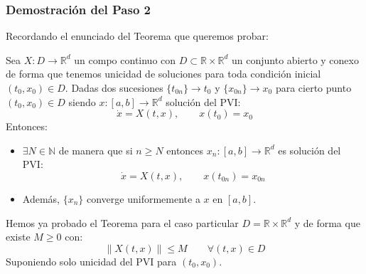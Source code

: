 \subsubsection{Demostración del Paso 2}
\noindent
Recordando el enunciado del Teorema que queremos probar:
\begin{teo} 
    Sea $X:D\to \mathbb{R}^d$ un compo continuo con $D\subset \mathbb{R}\times \mathbb{R}^d$ un conjunto abierto y conexo de forma que tenemos unicidad de soluciones para toda condición inicial $(t_0,x_0)\in D$. Dadas dos sucesiones $\{t_{0n}\}\to t_0$ y $\{x_{0n}\}\to x_0$ para cierto punto $(t_0,x_0)\in D$ siendo $x:[a,b]\to \mathbb{R}^d$ solución del PVI:
    \begin{equation*}
        \dot{x} = X(t,x), \qquad x(t_0) = x_0
    \end{equation*}
    Entonces:
    \begin{itemize}
        \item $\exists N\in \mathbb{N}$ de manera que si $n\geq N$ entonces $x_n:[a,b]\to \mathbb{R}^d$ es solución del PVI:
            \begin{equation*}
                \dot{x} = X(t,x), \qquad x(t_{0n}) = x_{0n}
            \end{equation*}
        \item Además, $\{x_n\}$ converge uniformemente a $x$ en $[a,b]$.
    \end{itemize}
\end{teo}

\noindent
Hemos ya probado el Teorema para el caso particular $D=\mathbb{R}\times \mathbb{R}^d$ y de forma que existe $M\geq 0$ con:
\begin{equation*}
    \|X(t,x)\| \leq M \qquad \forall (t,x)\in D
\end{equation*}
Suponiendo solo unicidad del PVI para $(t_0,x_0)$.

